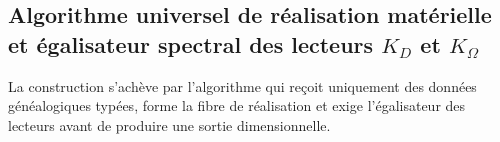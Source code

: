
\endgroup
\begingroup
\let\chapter\section
\let\section\subsection
\let\subsection\subsubsection
\let\subsubsection\paragraph
\let\clearpage\relax

\endgroup

\section{Algorithme universel de réalisation matérielle et égalisateur spectral des lecteurs \(K_D\) et \(K_\Omega\)}
La construction s’achève par l’algorithme qui reçoit uniquement des données généalogiques typées, forme la fibre de réalisation et exige l’égalisateur des lecteurs avant de produire une sortie dimensionnelle.

